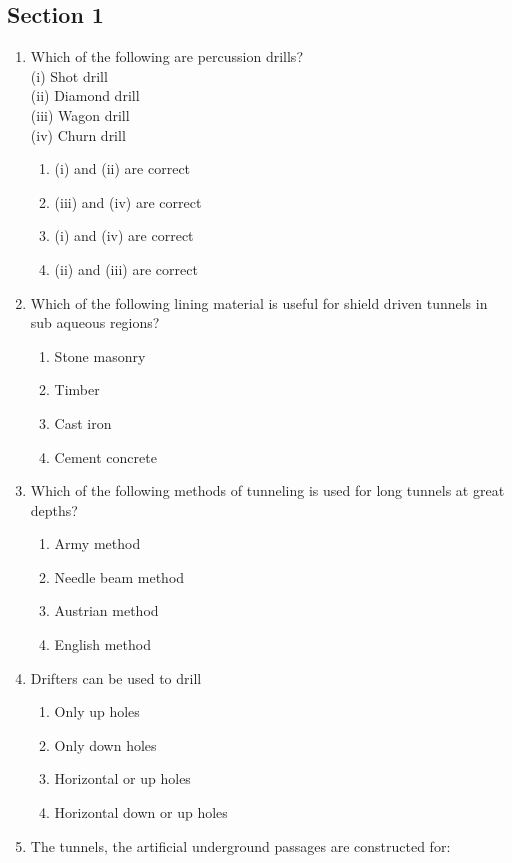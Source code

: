 \documentclass[11pt,a4paper]{article}
\begin{document}
\subsection*{Section 1}
\begin{enumerate}
\item{Which of the following are percussion drills? \\
 (i) Shot drill \\
 (ii) Diamond drill \\
 (iii) Wagon drill \\
 (iv) Churn drill}
\begin{enumerate}[label=\Alph*.]
\item{(i) and (ii) are correct}
\item{(iii) and (iv) are correct}
\item{(i) and (iv) are correct}
\item{(ii) and (iii) are correct}
\end{enumerate}
\item{Which of the following lining material is useful for shield driven tunnels in sub aqueous regions?}
\begin{enumerate}[label=\Alph*.]
\item{Stone masonry}
\item{Timber}
\item{Cast iron}
\item{Cement concrete}
\end{enumerate}
\item{Which of the following methods of tunneling is used for long tunnels at great depths?}
\begin{enumerate}[label=\Alph*.]
\item{Army method}
\item{Needle beam method}
\item{Austrian method}
\item{English method}
\end{enumerate}
\item{Drifters can be used to drill}
\begin{enumerate}[label=\Alph*.]
\item{Only up holes}
\item{Only down holes}
\item{Horizontal or up holes}
\item{Horizontal down or up holes}
\end{enumerate}
\item{The tunnels, the artificial underground passages are constructed for:}

\end{enumerate}
\end{document}
